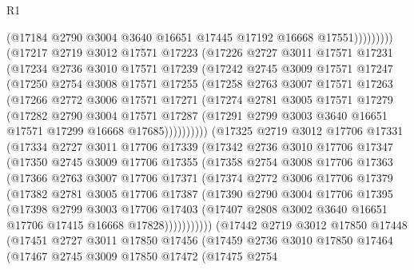 \begin{lexlean}{R1}
\begin{coremodule}
                    (@17184 @2790 @3004 @3640 @16651 @17445 @17192 @16668 @17551)))))))))
    (@17217
      @2719
      @3012
      @17571
      @17223
      (@17226
        @2727
        @3011
        @17571
        @17231
        (@17234
          @2736
          @3010
          @17571
          @17239
          (@17242
            @2745
            @3009
            @17571
            @17247
            (@17250
              @2754
              @3008
              @17571
              @17255
              (@17258
                @2763
                @3007
                @17571
                @17263
                (@17266
                  @2772
                  @3006
                  @17571
                  @17271
                  (@17274
                    @2781
                    @3005
                    @17571
                    @17279
                    (@17282
                      @2790
                      @3004
                      @17571
                      @17287
                      (@17291 @2799 @3003 @3640 @16651 @17571 @17299 @16668 @17685))))))))))
    (@17325
      @2719
      @3012
      @17706
      @17331
      (@17334
        @2727
        @3011
        @17706
        @17339
        (@17342
          @2736
          @3010
          @17706
          @17347
          (@17350
            @2745
            @3009
            @17706
            @17355
            (@17358
              @2754
              @3008
              @17706
              @17363
              (@17366
                @2763
                @3007
                @17706
                @17371
                (@17374
                  @2772
                  @3006
                  @17706
                  @17379
                  (@17382
                    @2781
                    @3005
                    @17706
                    @17387
                    (@17390
                      @2790
                      @3004
                      @17706
                      @17395
                      (@17398
                        @2799
                        @3003
                        @17706
                        @17403
                        (@17407 @2808 @3002 @3640 @16651 @17706 @17415 @16668 @17828)))))))))))
    (@17442
      @2719
      @3012
      @17850
      @17448
      (@17451
        @2727
        @3011
        @17850
        @17456
        (@17459
          @2736
          @3010
          @17850
          @17464
          (@17467
            @2745
            @3009
            @17850
            @17472
            (@17475
              @2754

\end{coremodule}
\end{lexlean}
